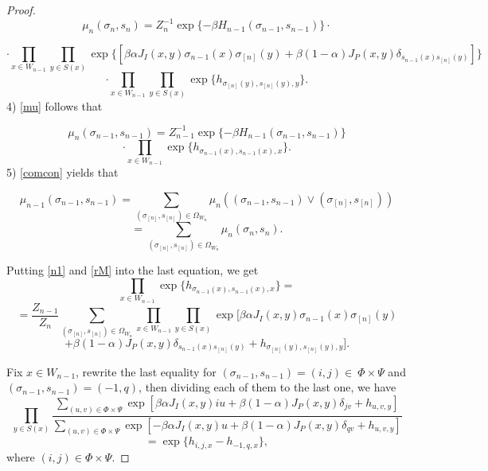 \documentclass[sn-mathphys]{sn-jnl}%
\theoremstyle{thmstyleone}%
\theoremstyle{thmstyletwo}%
\theoremstyle{thmstylethree}%
\begin{document}
\begin{proof}
$$\mu_{n}(\sigma_n, s_n)=Z_n^{-1}\exp\{-\beta H_{n-1}(\sigma_{n-1},s_{n-1})\}\cdot$$

$$\cdot\prod_{x\in W_{n-1}}\prod_{y\in S(x)}\exp\{\left[\beta \alpha  J_{I}(x,y)\sigma_{n-1}(x)\sigma_{[n]}(y)
+\beta (1-\alpha) J_{P}(x,y)\delta_{s_{n-1}(x)s_{[n]}(y)}\right]\}$$
\begin{equation}\label{rM}\cdot\prod_{x\in W_{n-1}}\prod_{y\in S(x)}\exp\{ h_{\sigma_{[n]}(y),s_{[n]}(y),y}\}.
\end{equation}
4) \eqref{mu} follows that

$$\mu_{n}(\sigma_{n-1}, s_{n-1})=Z_{n-1}^{-1}\exp\{-\beta H_{n-1}(\sigma_{n-1},s_{n-1})\}$$
\begin{equation}\label{n1}\cdot\prod_{x\in
W_{n-1}}\exp\{h_{\sigma_{n-1}(x),s_{n-1}(x),x}\}.
\end{equation}
5) \eqref{comcon} yields that

 $$\mu _{n -1}(\sigma_{n-1}, s_{n-1})=\sum\limits_{(\sigma_{[n]}, s_{[n]})\in \Omega _{W_n}} \mu
_{n}((\sigma_{n-1}, s_{n-1}) \vee (\sigma_{[n]}, s_{[n]}))$$$$=\sum\limits_{(\sigma_{[n]}, s_{[n]})  \in {\Omega _{W_n}}} \mu
_{n}(\sigma_n,s_n).$$

Putting \eqref{n1} and \eqref{rM} into the last equation, we get
$$\prod _{x\in
W_{n-1}}\exp\{h_{\sigma_{n-1}(x),s_{n-1}(x),x}\}=$$
$$=\frac{Z_{n-1}}{Z_n}\sum\limits_{(\sigma_{[n]}, s_{[n]})  \in {\Omega _{W_n}}} \prod_{x\in W_{n-1}}\prod_{y\in S(x)}\exp[\beta \alpha  J_{I}(x,y)\sigma_{n-1}(x)\sigma_{[n]}(y)$$
\begin{equation}\label{cc3}
+\beta (1-\alpha) J_{P}(x,y)\delta_{s_{n-1}(x)s_{[n]}(y)}+ h_{\sigma_{[n]}(y),s_{[n]}(y),y}].
\end{equation}

Fix $x\in W_{n-1}$, rewrite the last equality for $(\sigma_{n-1},s_{n-1})=(i,j)\in\ \Phi\times\Psi$ and $(\sigma_{n-1},s_{n-1})=(-1,q)$, then dividing each of them to the last one, we have
$$
\prod\limits_{y\in S(x)}\frac{\sum\limits_{(u,v)\in \Phi\times\Psi}\exp\left[\beta \alpha  J_{I}(x,y)iu
+\beta (1-\alpha) J_{P}(x,y)\delta_{jv}+ h_{u,v,y}\right]}{\sum\limits_{(u,v)\in \Phi\times\Psi}\exp\left[-\beta \alpha  J_{I}(x,y)u
+\beta (1-\alpha) J_{P}(x,y)\delta_{qv}+ h_{u,v,y}\right]}$$
\begin{equation}\label{mainone}=\exp\{h_{i,j,x}-h_{-1,q,x}\},
\end{equation}
where $(i,j)\in\Phi\times\Psi$.


\end{proof}
\end{document}
